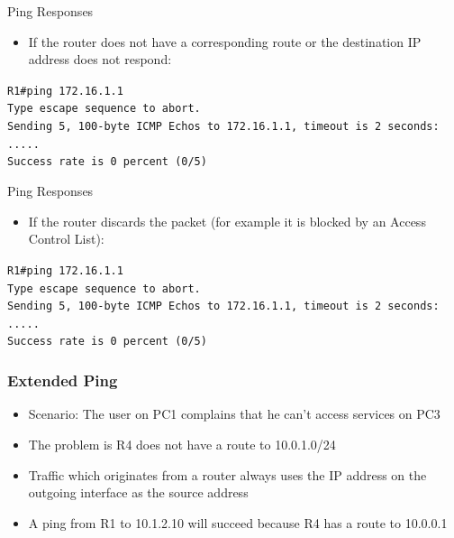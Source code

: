 \documentclass[pdflatex,compress,mathserif]{beamer}
\begin{document}
\begin{frame}{Ping Responses}
	\begin{itemize}
		\item If the router does not have a corresponding route or the destination IP
address does not respond:
	\end{itemize}
	\texttt{R1\#ping 172.16.1.1
\\
		Type escape sequence to abort.
\\
		Sending 5, 100-byte ICMP Echos to 172.16.1.1, timeout is 2
seconds:
\\
		.....
\\
		Success rate is 0 percent (0/5)} \\
\end{frame}

\begin{frame}{Ping Responses}
	\begin{itemize}
		\item If the router discards the packet (for example it is blocked by an Access
		Control List):
	\end{itemize}
	\texttt{R1\#ping 172.16.1.1
\\
		Type escape sequence to abort.
\\
		Sending 5, 100-byte ICMP Echos to 172.16.1.1, timeout is 2
seconds:
\\
		.....
\\
		Success rate is 0 percent (0/5)} \\
\end{frame}

\begin{frame}
	\frametitle{Extended Ping}
	\begin{itemize}
		\item Scenario: The user on PC1 complains that he can’t access services on PC3
		\item The problem is R4 does not have a route to 10.0.1.0/24
		\item Traffic which originates from a router always uses the IP address on the
outgoing interface as the source address
		\item A ping from R1 to 10.1.2.10 will succeed because R4 has a route to
10.0.0.1
	\end{itemize}
\end{frame}
\end{document}
